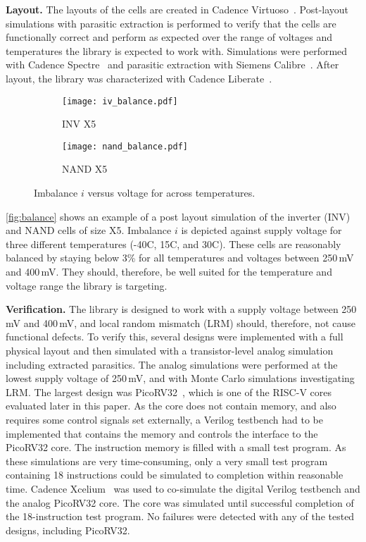 \noindent
\textbf{Layout.}
The layouts of the cells are created in Cadence Virtuoso~\cite{virtuoso}.  
Post-layout simulations with parasitic extraction is performed to verify that the cells are functionally correct and perform as expected over the range of voltages and temperatures the library is expected to work with.
Simulations were performed with Cadence Spectre~\cite{spectre} and parasitic extraction with Siemens Calibre~\cite{calibre}.  After layout, the library was characterized with Cadence Liberate~\cite{liberate}.

 \begin{figure}[t]
   \centering
     \begin{subfigure}[b]{0.49\columnwidth}
       \centering
       \texttt{[image: iv\_balance.pdf]}
       \caption{INV X5}
       \label{fig:balance_iv}
     \end{subfigure}
     \hfill
     \begin{subfigure}[b]{0.49\columnwidth}
       \centering
       \texttt{[image: nand\_balance.pdf]}
       \caption{NAND X5}
       \label{fig:balance_nand}
     \end{subfigure}
     \caption{Imbalance $i$ versus voltage for across temperatures.}
     \label{fig:balance}
\end{figure}

\autoref{fig:balance} shows an example of a post layout simulation of the inverter (INV) and NAND cells of size X5.
Imbalance $i$ is depicted against supply voltage for three different temperatures (-40\textdegree C, 15\textdegree C, and 30\textdegree C).
These cells are reasonably balanced by staying below 3\% for all temperatures and voltages between 250\,mV and 400\,mV.  They should, therefore, be well suited for the temperature and voltage range the library is targeting.  

\noindent
\textbf{Verification.}
The library is designed to work with a supply voltage between 250\,mV and 400\,mV, and local random mismatch (LRM) should, therefore, not cause functional defects.
To verify this, several designs were implemented with a full physical layout and then simulated with a transistor-level analog simulation including extracted parasitics.
The analog simulations were performed at the lowest supply voltage of 250\,mV, and with Monte Carlo simulations investigating LRM.
The largest design was PicoRV32~\cite{picorv32:GITHUB}, which is one of the RISC-V cores evaluated later in this paper.  As the core does not contain memory, and also requires some control signals set externally, a Verilog testbench had to be implemented that contains the memory and controls the interface to the PicoRV32 core.
The instruction memory is filled with a small test program.  As these simulations are very time-consuming, only a very small test program containing 18 instructions could be simulated to completion within reasonable time.
Cadence Xcelium~\cite{xcelium} was used to co-simulate the digital Verilog testbench and the analog PicoRV32 core.
The core was simulated until successful completion of the 18-instruction test program. 
No failures were detected with any of the tested designs, including PicoRV32.  
